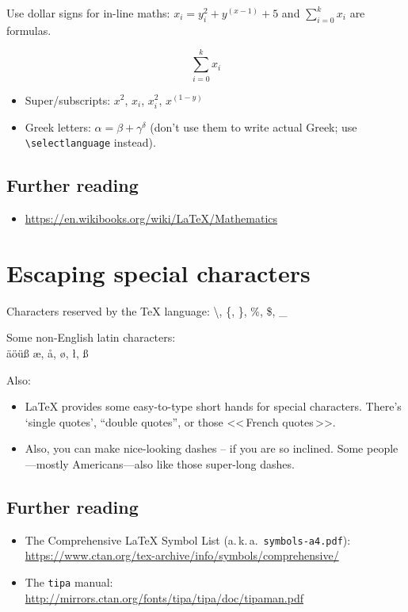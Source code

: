 \documentclass{scrartcl}
\begin{document}
Use dollar signs for in-line maths:
$ x_i = y_i^2 + y^{(x - 1)} + 5 $ and $\sum_{i = 0}^k x_i$ are formulas.

\[
  \sum_{i = 0}^k x_i
\]

\begin{itemize}
  \item Super/subscripts: $x^2$, $x_i$, $x_i^2$, $x^{(1 - y)}$
  \item Greek letters: $\alpha = \beta + \gamma^\delta$ (don't use them to write
    actual Greek; use \texttt{\textbackslash{}selectlanguage} instead).
\end{itemize}

\subsection*{Further reading}
\begin{itemize}
  \item \url{https://en.wikibooks.org/wiki/LaTeX/Mathematics}
\end{itemize}

\section{Escaping special characters}

Characters reserved by the \TeX{} language:
\textbackslash, \{, \}, \%, \$, \_

Some non-English latin characters: \\
äöüß  \ae, \aa, \o, \l, \ss


Also:
\begin{itemize}
  \item \LaTeX{} provides some easy-to-type short hands for special characters.
    There's `single quotes', ``double quotes'', or those <<\,French quotes\,>>.
  \item Also, you can make nice-looking dashes -- if you are so inclined.
    Some people---mostly Americans---also like those super-long dashes.
\end{itemize}

\subsection*{Further reading}
\begin{itemize}
  \item The Comprehensive \LaTeX{} Symbol List (a.\,k.\,a.\ \texttt{symbols-a4.pdf}): \\
    \url{https://www.ctan.org/tex-archive/info/symbols/comprehensive/}
  \item The \texttt{tipa} manual: \\
    \url{http://mirrors.ctan.org/fonts/tipa/tipa/doc/tipaman.pdf}
\end{itemize}
\end{document}

